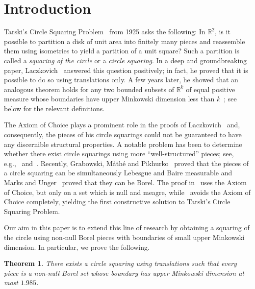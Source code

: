\documentclass[12pt,a4paper]{amsart}
\numberwithin{equation}{section}
\newtheorem{theorem}[equation]{Theorem}
\theoremstyle{definition}
\begin{document}
\maketitle

\section{Introduction}

Tarski's Circle Squaring Problem~\cite{Tarski25} from 1925 asks the following: In $\mathbb{R}^2$, is it possible to partition a disk of unit area into finitely many pieces and reassemble them using isometries to yield a partition of a unit square? Such a partition is called a \emph{squaring of the circle} or a \emph{circle squaring}. In a deep and groundbreaking paper, Laczkovich~\cite{Laczkovich90} answered this question positively; in fact, he proved that it is possible to do so using translations only. A few years later, he showed that an analogous theorem holds for any two bounded subsets of $\mathbb{R}^k$ of equal positive measure whose boundaries have upper Minkowski dimension less than $k$~\cite{Laczkovich92,Laczkovich92b}; see below for the relevant definitions. 

The Axiom of Choice plays a prominent role in the proofs of Laczkovich~\cite{Laczkovich90,Laczkovich92,Laczkovich92b} and, consequently, the pieces of his circle squarings could not be guaranteed to have any discernible structural properties. A notable problem has been to determine whether there exist circle squarings using more ``well-structured'' pieces; see, e.g.,~\cite[Section~10]{Laczkovich90} and~\cite[Appendix~C]{Wagon81}. Recently, Grabowski, M\'{a}th\'{e} and Pikhurko~\cite{GrabowskiMathePikhurko17} proved that the pieces of a circle squaring can be simultaneously Lebesgue and Baire measurable and Marks and Unger~\cite{MarksUnger17} proved that they can be Borel. The proof in~\cite{GrabowskiMathePikhurko17} uses the Axiom of Choice, but only on a set which is null and meagre, while~\cite{MarksUnger17} avoids the Axiom of Choice completely, yielding the first constructive solution to Tarski's Circle Squaring Problem. 

Our aim in this paper is to extend this line of research by obtaining a squaring of the circle using non-null Borel pieces with boundaries of small upper Minkowski dimension. In particular, we prove the following.

\begin{theorem}
\label{th:circleSquare}
There exists a circle squaring using translations such that every piece is a non-null Borel set whose boundary has upper Minkowski dimension at most $1.985$.
\end{theorem}
\end{document}
